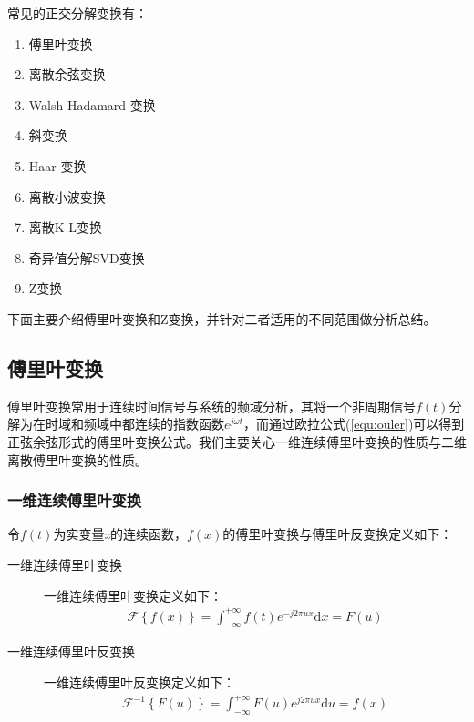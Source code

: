 \documentclass{hitreport}
\begin{document}
常见的正交分解变换有：
\begin{enumerate}
\item 傅里叶变换
\item 离散余弦变换
\item Walsh-Hadamard 变换
\item 斜变换
\item Haar 变换
\item 离散小波变换
\item 离散K-L变换
\item 奇异值分解SVD变换
\item Z变换 
\end{enumerate}

下面主要介绍傅里叶变换和Z变换，并针对二者适用的不同范围做分析总结。

\subsection{傅里叶变换}
傅里叶变换常用于连续时间信号与系统的频域分析，其将一个非周期信号$f\left(t\right)$分解为在时域和频域中都连续的指数函数$e^{j\omega t}$，而通过欧拉公式(\ref{equ:ouler})可以得到正弦余弦形式的傅里叶变换公式。我们主要关心一维连续傅里叶变换的性质与二维离散傅里叶变换的性质。

\subsubsection{一维连续傅里叶变换}

令$f\left(t\right)$为实变量\textit{x}的连续函数，$f\left(x\right)$的傅里叶变换与傅里叶反变换定义如下：
\begin{description}
\item[一维连续傅里叶变换] 
一维连续傅里叶变换定义如下：
\begin{align}
\mathscr{F}\left\{f\left(x\right)\right\} = \int_{-\infty}^{+\infty}f\left(t\right) e^{-j2\pi ux} \mathrm{d}x = F\left(u\right)
\end{align}
\end{description}

\begin{description}
\item[一维连续傅里叶反变换] 

一维连续傅里叶反变换定义如下：
\begin{align}
\mathscr{F}^{-1}\left\{F\left(u\right)\right\} = \int_{-\infty}^{+\infty}{F\left(u\right)e^{j2\pi ux}\mathrm{d} u} = f\left(x\right)
\end{align}
\end{description}
\end{document}
